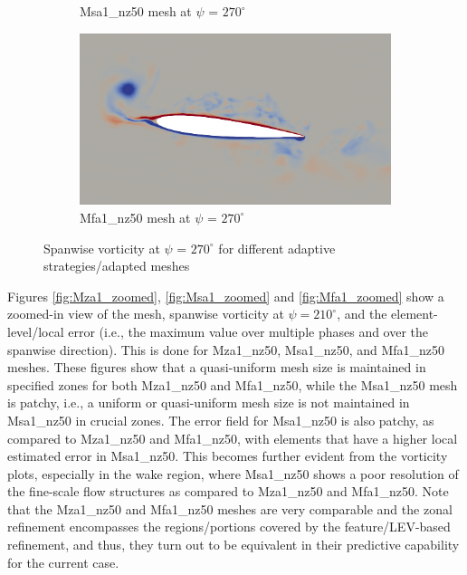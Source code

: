 \begin{figure}[H]
\begin{subfigure}[b]{0.475\textwidth}
\caption{Msa1\_nz50 mesh at $\psi$ = $270^\circ$}
\label{fig:hadapt_psi270}
\end{subfigure}
\begin{subfigure}[b]{0.475\textwidth}
\centering
\includegraphics[width=1\textwidth]{figures/adapt_strat/vorticity_plots/Mfa1_50/phase_270.png}
\caption{Mfa1\_nz50 mesh at $\psi$ = $270^\circ$}
\label{fig:FB_psi270}
\end{subfigure}
\caption{Spanwise vorticity at $\psi$ = $270^\circ$ for different adaptive strategies/adapted meshes}
\label{fig:vorticity_270}
\end{figure}

Figures \ref{fig:Mza1_zoomed}, \ref{fig:Msa1_zoomed} and \ref{fig:Mfa1_zoomed} show a zoomed-in view of the mesh, spanwise vorticity at $\psi=210^\circ$, and the element-level/local error (i.e., the maximum value over multiple phases and over the spanwise direction). This is done for Mza1\_nz50, Msa1\_nz50, and Mfa1\_nz50 meshes.
These figures show that a quasi-uniform mesh size is maintained in specified zones for both Mza1\_nz50 and Mfa1\_nz50, while the Msa1\_nz50 mesh is patchy, i.e., a uniform or quasi-uniform mesh size is not maintained in Msa1\_nz50 in crucial zones.
The error field for Msa1\_nz50 is also patchy, as compared to Mza1\_nz50 and Mfa1\_nz50, with elements that have a higher local estimated error in Msa1\_nz50.
This becomes further evident from the vorticity plots, especially in the wake region, where Msa1\_nz50 shows a poor resolution of the fine-scale flow structures as compared to Mza1\_nz50 and Mfa1\_nz50.
Note that the Mza1\_nz50 and Mfa1\_nz50 meshes are very comparable and the zonal refinement encompasses the regions/portions covered by the feature/LEV-based refinement, and thus, they turn out to be equivalent in their predictive capability for the current case.

